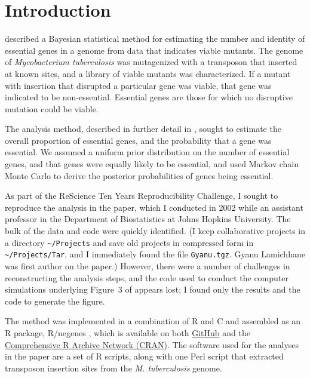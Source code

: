 \setlength{\parskip}{0.5\baselineskip}

\begin{quote}
\small
\articleABSTRACT
\end{quote}


\section{Introduction}

\citet{lamichhane2003} described a Bayesian statistical method for
estimating the number and identity of essential genes in a genome from
data that indicates viable mutants. The genome of \emph{Mycobacterium
tuberculosis\/} was mutagenized with a transposon that inserted at
known sites, and a library of viable mutants was characterized. If a
mutant with insertion that disrupted a particular gene was viable,
that gene was indicated to be non-essential. Essential genes are those
for which no disruptive mutation could be viable.

The analysis method, described in further detail in
\citet{blades2002}, sought to estimate the overall proportion of
essential genes, and the probability that a gene was essential. We
assumed a uniform prior distribution on the number of essential genes,
and that genes were equally likely to be essential, and used Markov
chain Monte Carlo to derive the posterior probabilities of genes being
essential.

As part of the ReScience Ten Years Reproducibility Challenge, I sought
to reproduce the analysis in the paper, which I conducted in 2002
while an assistant professor in the Department of Biostatistics at
Johns Hopkins University. The bulk of the data and code were quickly
identified. (I keep collaborative projects in a directory
\verb|~/Projects| and save old projects in compressed form in
\verb|~/Projects/Tar|, and I immediately found
the file \verb|Gyanu.tgz|. Gyanu Lamichhane was first author on the
paper.) However, there were a number of challenges in reconstructing
the analysis steps, and the code used to conduct the computer
simulations underlying Figure~3 of \citet{lamichhane2003} appears
lost; I found only the results and the code to generate the figure.

The method was implemented in a combination of R \citep{R} and C
\citep{C} and assembled as an R package, R/negenes \citep{negenes},
which is available on both
\href{https://github.com/kbroman/negenes}{GitHub} and the
\href{https://cran.r-project.org/package=negenes}{Comprehensive R
  Archive Network (CRAN)}. The software used for the analyses in the
paper are a set of R scripts, along with one Perl script
\citep{Perl} that extracted transposon insertion sites from the \emph{M.
tuberculosis\/} genome.

